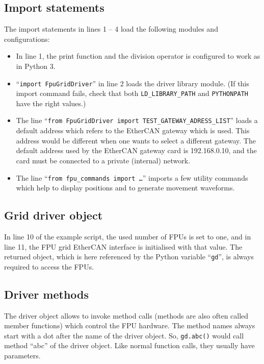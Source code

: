 \documentclass[11pt,a4paper]{report}
\begin{document}
\subsection{Import statements}

The import statements in lines 1 -- 4 load the following modules and
configurations:

\begin{itemize}
\item In line 1, the print function and the division operator is
  configured to work as in Python 3.
  
\item ``\texttt{import FpuGridDriver}'' in line 2 loads the driver
  library module. (If this import command fails, check that both
  \verb+LD_LIBRARY_PATH+ and \verb+PYTHONPATH+ have the right values.)

\item The line ``\texttt{from FpuGridDriver import
  TEST\_GATEWAY\_ADRESS\_LIST}'' loads a default address which refers to
  the EtherCAN gateway which is used. This address would be different
  when one wants to select a different gateway. The default
  address used by the EtherCAN gateway card is 192.168.0.10,
  and the card must be connected to a private (internal) network.

\item The line ``\texttt{from fpu\_commands import \ldots}'' imports a
  few utility commands which help to display positions and to generate
  movement waveforms.

 
\end{itemize}

\subsection{Grid driver object}

In line 10 of the example script, the used number of FPUs is set to
one, and in line 11, the FPU grid EtherCAN interface is initialised with that
value. The returned object, which is here referenced by the Python variable
``\texttt{gd}'', is always required to access the FPUs.

\subsection{Driver methods}
The driver object allows to invoke method calls (methods are also
often called member functions) which control the FPU hardware. The
method names always start with a dot after the name of the driver
object.  So, \texttt{gd.abc()} would call method ``abc'' of the driver
object. Like normal function calls, they usually have parameters.
\end{document}
